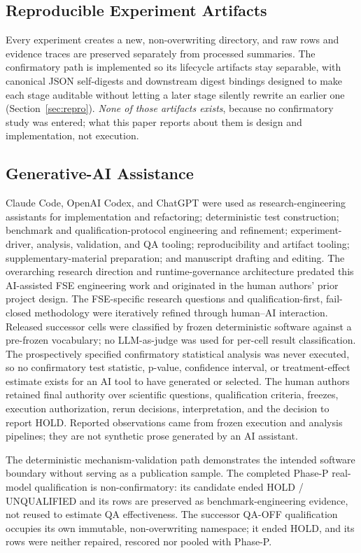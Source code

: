\documentclass[acmsmall,screen,review,anonymous]{acmart}
\begin{document}
\subsection{Reproducible Experiment Artifacts}

Every experiment creates a new, non-overwriting directory, and raw rows and
evidence traces are preserved separately from processed summaries. The
confirmatory path is implemented so its lifecycle artifacts stay separable, with
canonical JSON self-digests and downstream digest bindings designed to make each
stage auditable without letting a later stage silently rewrite an earlier one
(Section~\ref{sec:repro}). \emph{None of those artifacts exists}, because no
confirmatory study was entered; what this paper reports about them is design and
implementation, not execution.

\subsection{Generative-AI Assistance}

Claude Code, OpenAI Codex, and ChatGPT were used as research-engineering
assistants for implementation and refactoring; deterministic test construction;
benchmark and qualification-protocol engineering and refinement; experiment-driver,
analysis, validation, and QA tooling; reproducibility and artifact tooling;
supplementary-material preparation; and manuscript drafting and editing. The
overarching research direction and runtime-governance architecture predated this
AI-assisted FSE engineering work and originated in the human authors' prior project
design. The FSE-specific research questions and qualification-first, fail-closed
methodology were iteratively refined through human--AI interaction. Released
successor cells were classified by frozen deterministic software against a
pre-frozen vocabulary; no LLM-as-judge was used for per-cell result classification.
The prospectively specified confirmatory statistical analysis was never executed,
so no confirmatory test statistic, p-value, confidence interval, or treatment-effect
estimate exists for an AI tool to have generated or selected. The human authors
retained final authority over scientific questions, qualification criteria,
freezes, execution authorization, rerun decisions, interpretation, and the decision
to report HOLD. Reported observations came from frozen execution and analysis
pipelines; they are not synthetic prose generated by an AI assistant.

The deterministic mechanism-validation path demonstrates the intended software
boundary without serving as a publication sample. The completed Phase-P real-model
qualification is non-confirmatory: its candidate ended HOLD / UNQUALIFIED and its
rows are preserved as benchmark-engineering evidence, not reused to estimate QA
effectiveness. The successor QA-OFF qualification occupies its own immutable,
non-overwriting namespace; it ended HOLD, and its rows were neither repaired,
rescored nor pooled with Phase-P.
\end{document}
